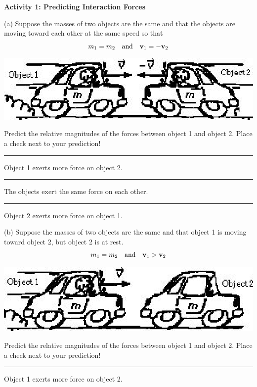 \textbf{Activity 1: Predicting Interaction Forces} 

(a) Suppose the masses of two objects are the same and that the objects are
moving toward each other at the same speed so that
\[
m_{1}=m_{2}\quad \mbox{and}\quad {{\bf v}_{1}}=-{{\bf v}_{2}}\]


\vspace{0.3cm}
{\par\centering \includegraphics{newtons_laws/newtons_laws_fig1.eps} \par}
\vspace{0.3cm}

\newpage

Predict the relative magnitudes of the forces between object 1 and object 2.
Place a check next to your prediction! 

\rule{0.5in}{0.1pt} Object 1 exerts more force on object 2. 

\rule{0.5in}{0.1pt} The objects exert the same force on each other. 

\rule{0.5in}{0.1pt} Object 2 exerts more force on object 1.

(b) Suppose the masses of two objects are the same and that object 1 is moving
toward object 2, but object 2 is at rest.
\[
m_{1}=m_{2}\quad \mbox{and}\quad {{\bf v}_{1}}>{{\bf v}_{2}}\]


\vspace{0.3cm}
{\par\centering \includegraphics{newtons_laws/newtons_laws_fig2.eps} \par}
\vspace{0.3cm}

Predict the relative magnitudes of the forces between object 1 and object 2.
Place a check next to your prediction! 

\rule{0.5in}{0.1pt} Object 1 exerts more force on object 2. 

